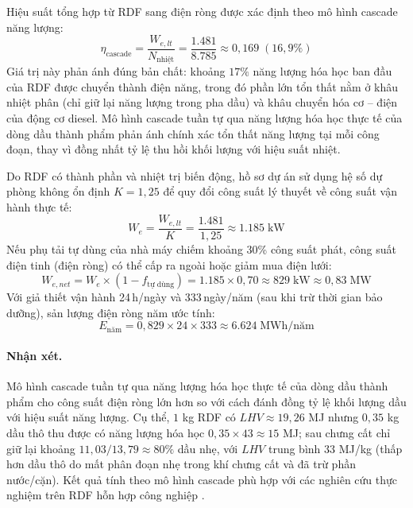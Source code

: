 \documentclass[../main.tex]{subfiles}
\begin{document}
Hiệu suất tổng hợp từ RDF sang điện ròng được xác định theo mô hình cascade năng lượng:
\begin{equation}
  \eta_{\text{cascade}} = \frac{W_{e,lt}}{N_{\text{nhiệt}}}
                       = \frac{1.481}{8.785}
                       \approx 0{,}169 \;(16{,}9\%)
\end{equation}
Giá trị này phản ánh đúng bản chất: khoảng $17\%$ năng lượng hóa học ban đầu của RDF được chuyển thành điện năng, trong đó phần lớn tổn thất nằm ở khâu nhiệt phân (chỉ giữ lại năng lượng trong pha dầu) và khâu chuyển hóa cơ -- điện của động cơ diesel. Mô hình cascade tuần tự qua năng lượng hóa học thực tế của dòng dầu thành phẩm phản ánh chính xác tổn thất năng lượng tại mỗi công đoạn, thay vì đồng nhất tỷ lệ thu hồi khối lượng với hiệu suất nhiệt.

Do RDF có thành phần và nhiệt trị biến động, hồ sơ dự án sử dụng hệ số dự phòng không ổn định $K = 1{,}25$ để quy đổi công suất lý thuyết về công suất vận hành thực tế:
\begin{equation}
  W_e = \frac{W_{e,lt}}{K}
      = \frac{1.481}{1{,}25}
      \approx 1.185 \;\text{kW}
\end{equation}
Nếu phụ tải tự dùng của nhà máy chiếm khoảng 30\% công suất phát, công suất điện tinh (điện ròng) có thể cấp ra ngoài hoặc giảm mua điện lưới:
\begin{equation}
  W_{e,net} = W_e \times (1 - f_{\text{tự dùng}})
            = 1.185 \times 0{,}70
            \approx 829 \;\text{kW} \approx 0{,}83\;\text{MW}
\end{equation}
Với giả thiết vận hành 24\,h/ngày và 333\,ngày/năm (sau khi trừ thời gian bảo dưỡng), sản lượng điện ròng năm ước tính:
\begin{equation}
  E_{\text{năm}} = 0{,}829 \times 24 \times 333
                \approx 6.624 \;\text{MWh/năm}
\end{equation}

\paragraph*{Nhận xét.} Mô hình cascade tuần tự qua năng lượng hóa học thực tế của dòng dầu thành phẩm cho công suất điện ròng lớn hơn so với cách đánh đồng tỷ lệ khối lượng dầu với hiệu suất năng lượng. Cụ thể, $1$ kg RDF có $LHV \approx 19{,}26$ MJ nhưng $0{,}35$ kg dầu thô thu được có năng lượng hóa học $0{,}35 \times 43 \approx 15$ MJ; sau chưng cất chỉ giữ lại khoảng $11{,}03/13{,}79 \approx 80\%$ dầu nhẹ, với $LHV$ trung bình $33$ MJ/kg (thấp hơn dầu thô do mất phân đoạn nhẹ trong khí chưng cất và đã trừ phần nước/cặn). Kết quả tính theo mô hình cascade phù hợp với các nghiên cứu thực nghiệm trên RDF hỗn hợp công nghiệp \cite{Sharuddin2016,Miandad2016,Williams2007}.
\end{document}
